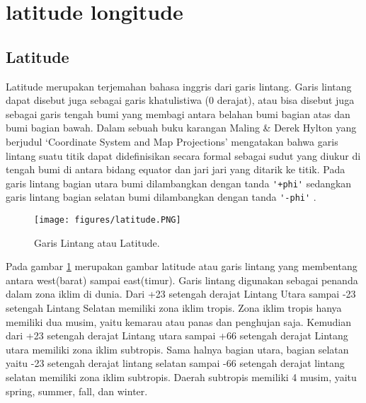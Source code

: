 
\section{latitude longitude}

\subsection{Latitude}
Latitude merupakan terjemahan bahasa inggris dari garis lintang. Garis lintang dapat disebut juga sebagai garis khatulistiwa (0 derajat), atau bisa disebut juga sebagai garis tengah bumi yang membagi antara belahan bumi bagian atas dan bumi bagian bawah.
Dalam sebuah buku karangan Maling \& Derek Hylton yang berjudul `Coordinate System and Map Projections' mengatakan bahwa garis lintang suatu titik dapat didefinisikan secara formal sebagai sudut yang diukur di tengah bumi di antara bidang equator dan jari jari yang ditarik ke titik. 
Pada garis lintang bagian utara bumi dilambangkan dengan tanda \verb|'+phi'| 
sedangkan garis lintang bagian selatan bumi dilambangkan dengan tanda \verb|'-phi'| 
\cite{maling2013coordinate}. 

	\begin{figure}[ht]
	\centerline{\texttt{[image: figures/latitude.PNG]}}
	\caption{Garis Lintang atau Latitude.}
	\label{latitude}
	\end{figure}
Pada gambar \ref{latitude} merupakan gambar latitude atau garis lintang yang membentang antara west(barat) sampai east(timur).
Garis lintang digunakan sebagai penanda dalam zona iklim di dunia. Dari +23 setengah derajat Lintang Utara sampai -23 setengah Lintang Selatan memiliki zona iklim tropis. Zona iklim tropis hanya memiliki dua musim, yaitu kemarau atau panas dan penghujan saja. Kemudian dari +23 setengah derajat Lintang utara sampai +66 setengah derajat Lintang utara memiliki zona iklim subtropis. Sama halnya bagian utara, bagian selatan yaitu -23 setengah derajat lintang selatan sampai -66 setengah derajat lintang selatan memiliki zona iklim subtropis. Daerah subtropis memiliki 4 musim, yaitu spring, summer, fall, dan winter. 

